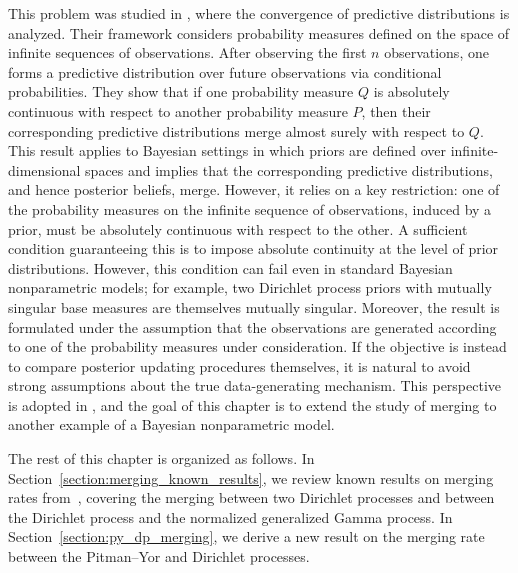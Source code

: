 This problem was studied in \cite{blackwell1962merging}, where the convergence of predictive distributions is analyzed. Their framework considers probability measures defined on the space of infinite sequences of observations. After observing the first $n$ observations, one forms a predictive distribution over future observations via conditional probabilities. They show that if one probability measure $Q$ is absolutely continuous with respect to another probability measure $P$, then their corresponding predictive distributions merge almost surely with respect to $Q$. This result applies to Bayesian settings in which priors are defined over infinite-dimensional spaces and implies that the corresponding predictive distributions, and hence posterior beliefs, merge. However, it relies on a key restriction: one of the probability measures on the infinite sequence of observations, induced by a prior, must be absolutely continuous with respect to the other. A sufficient condition guaranteeing this is to impose absolute continuity at the level of prior distributions. However, this condition can fail even in standard Bayesian nonparametric models; for example, two Dirichlet process priors with mutually singular base measures are themselves mutually singular. Moreover, the result is formulated under the assumption that the observations are generated according to one of the probability measures under consideration. If the objective is instead to compare posterior updating procedures themselves, it is natural to avoid strong assumptions about the true data-generating mechanism. This perspective is adopted in \cite{catalano2026merging}, and the goal of this chapter is to extend the study of merging to another example of a Bayesian nonparametric model.

The rest of this chapter is organized as follows. In Section~\ref{section:merging_known_results}, we review known results on merging rates from~\cite{catalano2026merging}, covering the merging between two Dirichlet processes and between the Dirichlet process and the normalized generalized Gamma process. In Section~\ref{section:py_dp_merging}, we derive a new result on the merging rate between the Pitman--Yor and Dirichlet processes.
